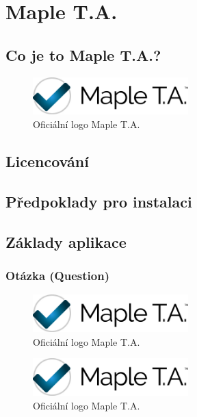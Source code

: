 \documentclass[
print,
  11pt,
  table,   
  nolof,    
  nolot,
  oneside,
  draft
]{fithesis3}
\begin{document}
\chapter{Maple T.A.}
	\section{Co je to Maple T.A.?}
		\begin{figure}
		  \begin{center}
		    \includegraphics[width=60mm]{images/MapleTA_logo.jpg}
		   \end{center}
		  \caption{Oficiální logo Maple T.A.  \cite{maple-logo}}
		  \label{fig:maplelogo}
		\end{figure}

	\section{Licencování}
	\section{Předpoklady pro instalaci}
	\section{Základy aplikace}
		\subsection{Otázka (Question)}

		\begin{figure}
		  \begin{center}
		    \includegraphics[width=60mm]{images/MapleTA_logo.jpg}
		   \end{center}
		  \caption{Oficiální logo Maple T.A.  \cite{maple-logo}}
		  \label{fig:maplelogo}
		\end{figure}

		\begin{figure}
		  \begin{center}
		    \includegraphics[width=60mm]{images/MapleTA_logo.jpg}
		   \end{center}
		  \caption{Oficiální logo Maple T.A.  \cite{maple-logo}}
		  \label{fig:maplelogo}
		\end{figure}
\end{document}
